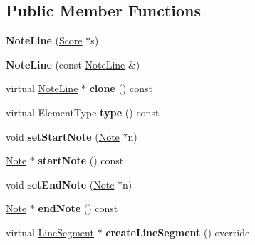 \subsection*{Public Member Functions}
\begin{DoxyCompactItemize}
\item 
\mbox{\label{class_ms_1_1_note_line_a1f9d3e58ed92feae9221fe3ff4cb4893}} 
{\bfseries Note\+Line} (\hyperlink{class_ms_1_1_score}{Score} $\ast$s)
\item 
\mbox{\label{class_ms_1_1_note_line_a8f757f0577baa1c56628a5804314860c}} 
{\bfseries Note\+Line} (const \hyperlink{class_ms_1_1_note_line}{Note\+Line} \&)
\item 
\mbox{\label{class_ms_1_1_note_line_a1cdd5e92cf0853f22838eaef2c180e28}} 
virtual \hyperlink{class_ms_1_1_note_line}{Note\+Line} $\ast$ {\bfseries clone} () const
\item 
\mbox{\label{class_ms_1_1_note_line_a38e30bbfa67ccc3a77814b7ef3113dcf}} 
virtual Element\+Type {\bfseries type} () const
\item 
\mbox{\label{class_ms_1_1_note_line_ab0f48c104bd23fef1b621fa6aa38c77a}} 
void {\bfseries set\+Start\+Note} (\hyperlink{class_ms_1_1_note}{Note} $\ast$n)
\item 
\mbox{\label{class_ms_1_1_note_line_a83558c60bfe9bc7538457c4510e02e05}} 
\hyperlink{class_ms_1_1_note}{Note} $\ast$ {\bfseries start\+Note} () const
\item 
\mbox{\label{class_ms_1_1_note_line_a8c85374dfb151e43b0f49ddf2bd7b539}} 
void {\bfseries set\+End\+Note} (\hyperlink{class_ms_1_1_note}{Note} $\ast$n)
\item 
\mbox{\label{class_ms_1_1_note_line_ae3c70f71eec3d17c35672722c2ae609c}} 
\hyperlink{class_ms_1_1_note}{Note} $\ast$ {\bfseries end\+Note} () const
\item 
\mbox{\label{class_ms_1_1_note_line_a53f3788727ae996c7584a47cf30a070b}} 
virtual \hyperlink{class_ms_1_1_line_segment}{Line\+Segment} $\ast$ {\bfseries create\+Line\+Segment} () override
\end{DoxyCompactItemize}
